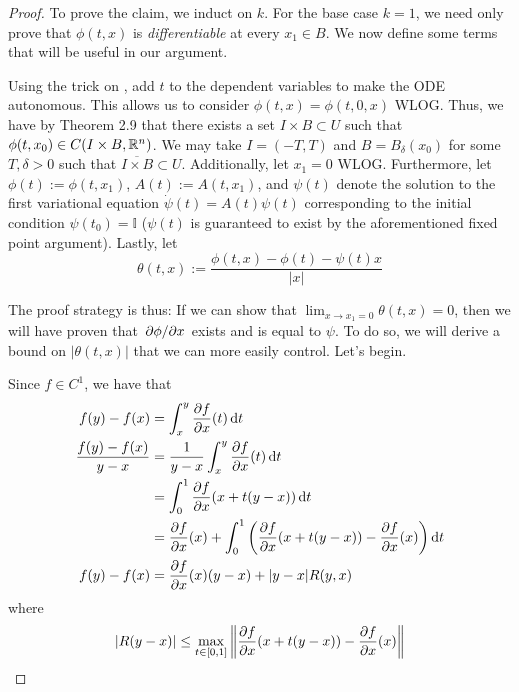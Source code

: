 \documentclass[../notes.tex]{subfiles}
\begin{document}
\begin{itemize}
\begin{proof}


        To prove the claim, we induct on $k$. For the base case $k=1$, we need only prove that $\phi(t,x)$ is \emph{differentiable} at every $x_1\in B$. We now define some terms that will be useful in our argument.\par
        Using the trick on \textcite[7]{bib:Teschl}, add $t$ to the dependent variables to make the ODE autonomous. This allows us to consider $\phi(t,x)=\phi(t,0,x)$ WLOG. Thus, we have by Theorem 2.9 that there exists a set $I\times B\subset U$ such that $\phi(t,x_0)\in C(I\times B,\mathbb{R}^n)$. We may take $I=(-T,T)$ and $B=B_\delta(x_0)$ for some $T,\delta>0$ such that $\overline{I\times B}\subset U$. Additionally, let $x_1=0$ WLOG. Furthermore, let $\phi(t):=\phi(t,x_1)$, $A(t):=A(t,x_1)$, and $\psi(t)$ denote the solution to the first variational equation $\dot{\psi}(t)=A(t)\psi(t)$ corresponding to the initial condition $\psi(t_0)=\mathbb{I}$ ($\psi(t)$ is guaranteed to exist by the aforementioned fixed point argument). Lastly, let
        \begin{equation*}
            \theta(t,x) := \frac{\phi(t,x)-\phi(t)-\psi(t)x}{|x|}
        \end{equation*}\par
        The proof strategy is thus: If we can show that $\lim_{x\to x_1=0}\theta(t,x)=0$, then we will have proven that $\pdv*{\phi}{x}$ exists and is equal to $\psi$. To do so, we will derive a bound on $|\theta(t,x)|$ that we can more easily control. Let's begin.\par
        Since $f\in C^1$, we have that
        \begin{align*}
            f(y)-f(x) &= \int_x^y{\pdv{f}{x}}(t)\dd{t}\\
            \frac{f(y)-f(x)}{y-x} &= \frac{1}{y-x}\int_x^y{\pdv{f}{x}}(t)\dd{t}\\
            &= \int_0^1{\pdv{f}{x}}(x+t(y-x))\dd{t}\\
            &= {\pdv{f}{x}}(x)+\int_0^1\left( {\pdv{f}{x}}(x+t(y-x))-{\pdv{f}{x}}(x) \right)\dd{t}\\
            f(y)-f(x) &= {\pdv{f}{x}}(x)(y-x)+|y-x|R(y,x)
        \end{align*}
        where
        \begin{equation*}
            |R(y-x)| \leq \max_{t\in[0,1]}\norm{{\pdv{f}{x}}(x+t(y-x))-{\pdv{f}{x}}(x)}
        \end{equation*}

\end{proof}
\end{itemize}
\end{document}
